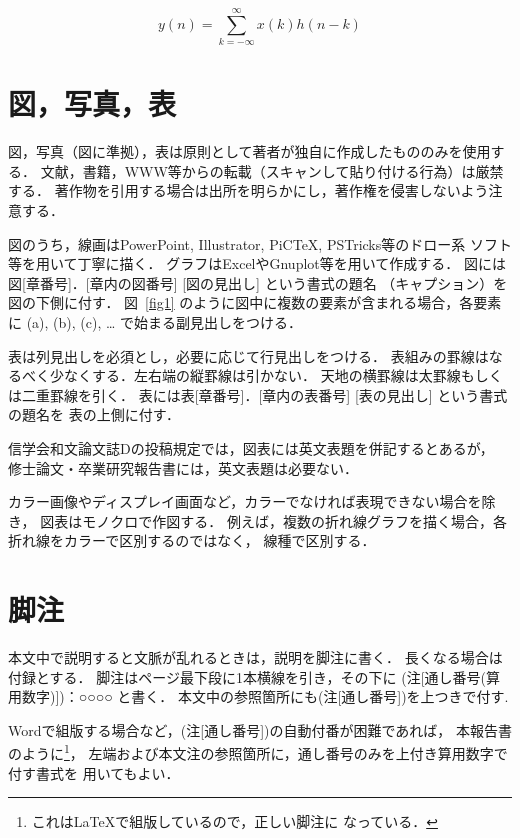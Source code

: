\documentclass[main]{subfiles}
\begin{document}
\begin{equation}
y(n)=\sum_{k=-\infty}^{\infty}x(k)h(n-k)\label{eqn1}
\end{equation}

\section{図，写真，表}
図，写真（図に準拠），表は原則として著者が独自に作成したもののみを使用する．
文献，書籍，WWW等からの転載（スキャンして貼り付ける行為）は厳禁する．
著作物を引用する場合は出所を明らかにし，著作権を侵害しないよう注意する．

図のうち，線画はPowerPoint, Illustrator, PiC\TeX, PSTricks等のドロー系
ソフト等を用いて丁寧に描く．
グラフはExcelやGnuplot等を用いて作成する．
図には図[章番号]．[章内の図番号] [図の見出し] という書式の題名
（キャプション）を図の下側に付す．
図~\ref{fig1} のように図中に複数の要素が含まれる場合，各要素に
(a), (b), (c), … で始まる副見出しをつける．

表は列見出しを必須とし，必要に応じて行見出しをつける．
表組みの罫線はなるべく少なくする．左右端の縦罫線は引かない．
天地の横罫線は太罫線もしくは二重罫線を引く．
表には表[章番号]．[章内の表番号] [表の見出し] という書式の題名を
表の上側に付す．

信学会和文論文誌Dの投稿規定では，図表には英文表題を併記するとあるが，
修士論文・卒業研究報告書には，英文表題は必要ない．

カラー画像やディスプレイ画面など，カラーでなければ表現できない場合を除き，
図表はモノクロで作図する．
例えば，複数の折れ線グラフを描く場合，各折れ線をカラーで区別するのではなく，
線種で区別する．

\section{脚注}
本文中で説明すると文脈が乱れるときは，説明を脚注に書く．
長くなる場合は付録とする．
脚注はページ最下段に1本横線を引き，その下に
 (注[通し番号(算用数字)])：○○○○ と書く．
本文中の参照箇所にも(注[通し番号])を上つきで付す.

Wordで組版する場合など，(注[通し番号])の自動付番が困難であれば，
本報告書のように\footnote{これは\LaTeX で組版しているので，正しい脚注に
	なっている．}，
左端および本文注の参照箇所に，通し番号のみを上付き算用数字で付す書式を
用いてもよい．
    
\end{document}
